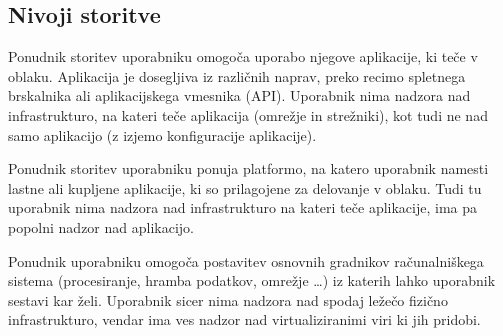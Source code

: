 \documentclass[12pt,a4paper,openany,tikz]{book}
\theoremstyle{plain}
\theoremstyle{definition}
\begin{document}
\subsection{Nivoji storitve}
\label{sub:Nivoji storitve}

\begin{description}[style=nextline]
	\item[\gls{SaaS}] Ponudnik storitev uporabniku omogoča uporabo njegove aplikacije, ki teče v oblaku. Aplikacija je dosegljiva iz različnih naprav, preko recimo spletnega brskalnika ali aplikacijskega vmesnika (API). Uporabnik nima nadzora nad infrastrukturo, na kateri teče aplikacija (omrežje in strežniki), kot tudi ne nad samo aplikacijo (z izjemo konfiguracije aplikacije).

	\item[\gls{PaaS}] Ponudnik storitev uporabniku ponuja platformo, na katero uporabnik namesti lastne ali kupljene aplikacije, ki so prilagojene za delovanje v oblaku. Tudi tu uporabnik nima nadzora nad infrastrukturo na kateri teče aplikacije, ima pa popolni nadzor nad aplikacijo.

	\item[\gls{IaaS}] Ponudnik uporabniku omogoča postavitev osnovnih gradnikov računalniškega sistema (procesiranje, hramba podatkov, omrežje …) iz katerih lahko uporabnik sestavi kar želi. Uporabnik sicer nima nadzora nad spodaj ležečo fizično infrastrukturo, vendar ima ves nadzor nad virtualiziranimi viri ki jih pridobi.
\end{description}
\end{document}
